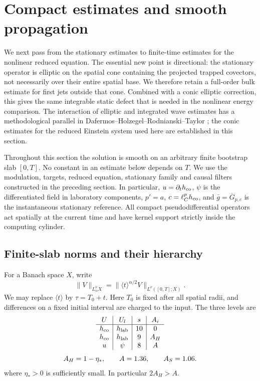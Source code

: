 \section{Compact estimates and smooth propagation}\label{sec:compact}

We next pass from the stationary estimates to finite-time estimates for the
nonlinear reduced equation.  The essential new point is directional: the
stationary operator is elliptic on the spatial cone containing the projected
trapped covectors, not necessarily over their entire spatial base.  We therefore
retain a full-order bulk estimate for first jets outside that cone.  Combined
with a conic elliptic correction, this gives the same integrable static defect
that is needed in the nonlinear energy comparison. The interaction of
elliptic and integrated wave estimates has a methodological parallel in
Dafermos--Holzegel--Rodnianski--Taylor
\cite{DafermosHolzegelRodnianskiTaylor2024}; the conic estimates for the
reduced Einstein system used here are established in this section.

Throughout this section the solution is smooth on an arbitrary finite bootstrap
slab $[0,T]$.  No constant in an estimate below depends on $T$.  We use the
modulation, targets, reduced equation, stationary family and causal filters
constructed in the preceding section.  In particular,
$u=\partial_t h_{\rm co}$, $\psi$ is the differentiated field in laboratory
components, $p'=a$, $c=\ell_C^p h_{\rm co}$, and
$\bar g=\overline G_{p,c}$ is the instantaneous stationary reference.
All compact pseudodifferential operators act spatially at the current time and
have kernel support strictly inside the computing cylinder.

\subsection{Finite-slab norms and their hierarchy}

For a Banach space $X$, write
\[
 \|V\|_{L^\nu_\alpha X}
   =\|\langle t\rangle^{\alpha/2}V\|_{L^\nu([0,T];X)}.
\]
We may replace $\langle t\rangle$ by $\tau=T_0+t$.  Here $T_0$ is fixed
after all spatial radii, and differences on a fixed initial interval are charged
to the input.  The three levels are
\begin{equation}\label{co2:levels}
 \begin{gathered}
 \begin{array}{c|c|c|c}
 U&U_l&s&A_i\\ \hline
 h_{\rm co}&h_{\rm lab}&10&0\\
 h_{\rm co}&h_{\rm lab}&9&A_H\\
 u&\psi&8&A
 \end{array}\\[3pt]
 A_H=1-\eta_*,\qquad A=1.36,\qquad A_S=1.06.
 \end{gathered}
\end{equation}
where $\eta_*>0$ is sufficiently small.  In particular $2A_H>A$.

